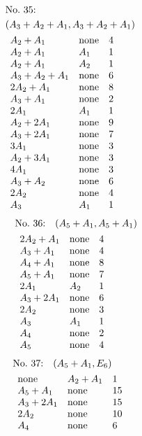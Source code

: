 %
%
\begin{align*}
&\hbox to 4cm {\textrm{No.~35:}\quad\hss}\\ 
&(A_{3}+A_{2}+A_{1}, A_{3}+A_{2}+A_{1})\\ 
&\begin{array}{lll}
A_{2}+A_{1} & \none & 4\\
A_{2}+A_{1} & A_{1} & 1\\
A_{2}+A_{1} & A_{2} & 1\\
A_{3}+A_{2}+A_{1} & \none & 6\\
2A_{2}+A_{1} & \none & 8\\
A_{3}+A_{1} & \none & 2\\
2A_{1} & A_{1} & 1\\
A_{2}+2A_{1} & \none & 9\\
A_{3}+2A_{1} & \none & 7\\
3A_{1} & \none & 3\\
A_{2}+3A_{1} & \none & 3\\
4A_{1} & \none & 3\\
A_{3}+A_{2} & \none & 6\\
2A_{2} & \none & 4\\
A_{3} & A_{1} & 1\\
\end{array}
\end{align*}
%
%
\begin{align*}
&\hbox to 4cm {\textrm{No.~36:}\quad$(A_{5}+A_{1}, A_{5}+A_{1})$\hss}\\ 
&\begin{array}{lll}
2A_{2}+A_{1} & \none & 4\\
A_{3}+A_{1} & \none & 4\\
A_{4}+A_{1} & \none & 8\\
A_{5}+A_{1} & \none & 7\\
2A_{1} & A_{2} & 1\\
A_{3}+2A_{1} & \none & 6\\
2A_{2} & \none & 3\\
A_{3} & A_{1} & 1\\
A_{4} & \none & 2\\
A_{5} & \none & 4\\
\end{array}
\end{align*}
%
%
\begin{align*}
&\hbox to 4cm {\textrm{No.~37:}\quad$(A_{5}+A_{1}, E_{6})$\hss}\\ 
&\begin{array}{lll}
\none & A_{2}+A_{1} & 1\\
A_{5}+A_{1} & \none & 15\\
A_{3}+2A_{1} & \none & 15\\
2A_{2} & \none & 10\\
A_{4} & \none & 6\\
\end{array}
\end{align*}
